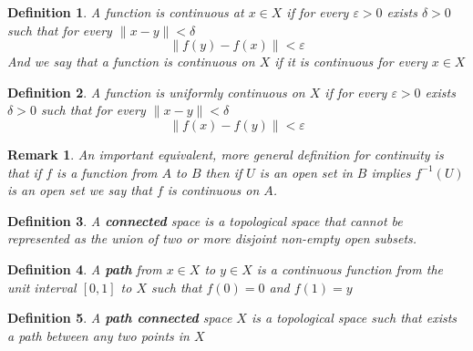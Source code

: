 \documentclass[11pt,a4paper]{article}
\theoremstyle{plain}
\newtheorem{definition}{Definition}[section]
\newtheorem{remark}{Remark}[section]
\begin{document}
	\begin{definition}
	A function is continuous at $x\in X$ if for every $\varepsilon > 0$
	exists $\delta > 0$ such that for every $\|x-y\| < \delta$
	\[
		\|f(y) - f(x)\| < \varepsilon
	\]
	And we say that a function is continuous on $X$ if it is continuous
	for every $x\in X$
	\end{definition}
	\begin{definition}
	A function is uniformly continuous on $X$ if for every $\varepsilon > 0$
	exists $\delta > 0$ such that for every $\|x-y\| < \delta$
	\[
		\|f(x) - f(y)\| < \varepsilon
	\]
	\end{definition}
	\begin{remark}
	An important equivalent, more general definition for continuity is that
	if $f$ is a function from $A$ to $B$ then if $U$ is an open set in $B$
	implies $f^{-1}(U)$ is an open set we say that $f$ is continuous on $A$.
	\end{remark}
	\begin{definition}
	A \textbf{connected} space is a topological space that cannot be 
	represented as the union of two or more disjoint non-empty open subsets. 
	\end{definition}
	\begin{definition}
	A \textbf{path} from $x\in X$ to $y\in X$ is a continuous function from 
	the unit interval $[0,1]$ to $X$ such that $f(0) = 0$ and $f(1) = y$
	\end{definition}
	\begin{definition}
	A \textbf{path connected} space $X$ is a topological space such that 
	exists a path between any two points in $X$
	\end{definition}
	
	\newpage
	
\end{document}
